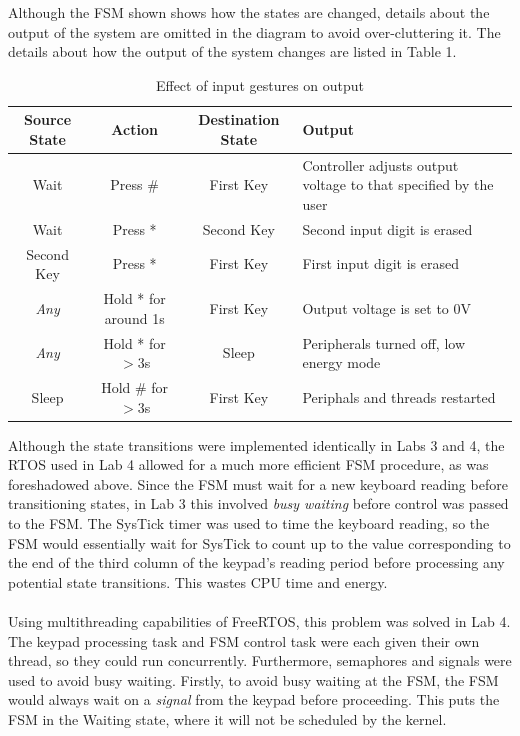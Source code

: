 \documentclass[12pt]{report}
\begin{document}
Although the FSM shown shows how the states are changed, details about the output of the system are
omitted in the diagram to avoid over-cluttering it. The details about how the output of the system
changes are listed in Table 1.
\begin{table}[h]
	\caption{Effect of input gestures on output}
	\begin{center}
		\begin{tabular}{|c|c|c|p{50mm}|}
			\hline
			Source State & Action & Destination State & Output\\\hline
			Wait & Press \# & First Key & Controller adjusts output voltage to that specified by
			the user\\\hline
			Wait & Press * & Second Key & Second input digit is erased\\\hline
			Second Key & Press * & First Key & First input digit is erased\\\hline
			\textit{Any} & Hold * for around 1s & First Key & Output voltage is set to 0V\\\hline
			\textit{Any} & Hold * for $> 3$s & Sleep & Peripherals turned off, low energy mode\\\hline
			Sleep & Hold \# for $>3$s & First Key & Periphals and threads restarted\\\hline
		\end{tabular}
	\end{center}
\end{table}
Although the state transitions were implemented identically in Labs 3 and 4, the RTOS used in Lab 4
allowed for a much more efficient FSM procedure, as was foreshadowed above. Since the FSM must wait
for a new keyboard reading before transitioning states, in Lab 3 this involved \textit{busy waiting}
before control was passed to the FSM. The SysTick timer was used to time the keyboard reading, so
the FSM would essentially wait for SysTick to count up to the value corresponding to the end of the
third column of the keypad's reading period before processing any potential state transitions. This
wastes CPU time and energy.\\\\
Using multithreading capabilities of FreeRTOS, this problem was solved in Lab 4. The keypad
processing task and FSM control task were each given their own thread, so they could run
concurrently. Furthermore, semaphores and signals were used to avoid busy waiting. Firstly, to avoid
busy waiting at the FSM, the FSM would always wait on a \textit{signal} from the keypad before
proceeding. This puts the FSM in the Waiting state, where it will not be scheduled by the kernel.
\end{document}
